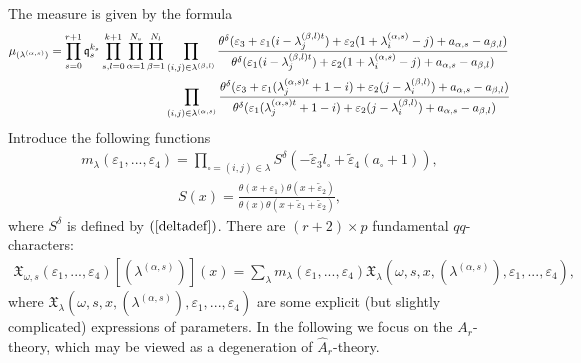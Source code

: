 \documentclass[12pt]{article}
\numberwithin{equation}{section}
\theoremstyle{definition}
\begin{document}
The measure is given by the formula
\begin{align*}
    \mu_{(\lambda^{(\alpha, s)})} = \prod\limits_{s = 0}^{r+1} \frak{q}_{s}^{k_s} \prod\limits_{s, l = 0}^{k+1} \prod\limits_{\alpha = 1}^{N_{s}}\prod\limits_{\beta = 1}^{N_{l}} &\prod\limits_{(i, j) \in \lambda^{(\beta, l)}} \frac{\theta^{\delta} (\varepsilon_3 + \varepsilon_1 (i - \lambda_{j}^{(\beta, l)t}) + \varepsilon_2 (1 + \lambda_{i}^{(\alpha, s)} - j) + a_{\alpha, s} - a_{\beta, l})}{\theta^{\delta}(\varepsilon_1 (i - \lambda_{j}^{(\beta, l)t}) + \varepsilon_2 (1 + \lambda_{i}^{(\alpha, s)} - j) + a_{\alpha, s} - a_{\beta, l})} \\
    &\prod\limits_{(i, j) \in \lambda^{(\alpha, s)}} \frac{\theta^{\delta}(\varepsilon_3 + \varepsilon_1 (\lambda_{j}^{(\alpha, s)t} + 1 - i) + \varepsilon_2 (j -\lambda_{i}^{(\beta, l)}) + a_{\alpha, s} - a_{\beta, l})}{\theta^{\delta}(\varepsilon_1 (\lambda_{j}^{(\alpha, s)t} + 1 - i) + \varepsilon_2 (j -\lambda_{i}^{(\beta, l)}) + a_{\alpha, s} - a_{\beta, l})}
\end{align*}
Introduce the following functions
\begin{align*}
    m_{\lambda}(\varepsilon_1 , ..., \varepsilon_{4}) = \prod\limits_{\square = (i, j) \in \lambda} S^{\delta}(-\tilde{\varepsilon}_{3} l_{\square} + \tilde{\varepsilon}_{4} (a_{\square} + 1)),
\end{align*}
\begin{align*}
    S(x) = \frac{\theta(x + \varepsilon_1) \theta(x + \tilde{\varepsilon}_2)}{\theta(x) \theta(x + \tilde{\varepsilon}_1 + \tilde{\varepsilon}_2 )},
\end{align*}
where $S^{\delta}$ is defined by $(\ref{deltadef})$.
There are $(r+2) \times p$ fundamental $qq$-characters:
 \begin{align}\label{genqq}
     \mathfrak{X}_{\omega, s}(\varepsilon_1 , ... , \varepsilon_4 )[(\lambda^{(\alpha , s)})](x) = \sum\limits_{\lambda} m_{\lambda}(\varepsilon_1 , ... , \varepsilon_4 ) \mathfrak{X}_{\lambda}(\omega, s, x, (\lambda^{(\alpha, s)}), \varepsilon_1 , ..., \varepsilon_4 ),
 \end{align}
 where $\mathfrak{X}_{\lambda}(\omega, s, x, (\lambda^{(\alpha, s)}), \varepsilon_1 , ..., \varepsilon_4 )$ are some explicit (but slightly complicated) expressions of parameters. In the following we focus on the $A_{r}$-theory, which may be viewed as a degeneration of $\hat{A}_{r}$-theory.
\end{document}
